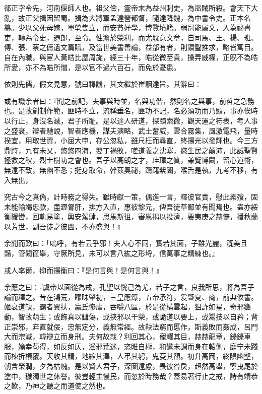 \begin{pinyinscope}
 
 
 郤正字令先，河南偃師人也。祖父儉，靈帝末為益州刺史，為盜賊所殺。會天下大亂，故正父揖因留蜀。揖為大將軍孟達營都督，隨達降魏，為中書令史。正本名纂。少以父死母嫁，單煢隻立，而安貧好學，博覽墳籍。弱冠能屬文，入為祕書吏，轉為令史，遷郎，至令。性澹於榮利，而尤耽意文章，自司馬、王、楊、班、傅、張、蔡之儔遺文篇賦，及當世美書善論，益部有者，則鑽鑿推求，略皆寓目。自在內職，與宦人黃皓比屋周旋，經三十年，皓從微至貴，操弄威權，正旣不為皓所愛，亦不為皓所憎，是以官不過六百石，而免於憂患。
 
 
 
 
 依則先儒，假文見意，號曰釋譏，其文繼於崔駰達旨。其辭曰：
 
 
 
 
 或有譏余者曰：『聞之前記，夫事與時並，名與功偕，然則名之與事，前哲之急務也。是故創制作範，匪時不立，流稱垂名，匪功不記，名必須功而乃顯，事亦俟時以行止，身沒名滅，君子所耻。是以達人研道，探賾索微，觀天運之符表，考人事之盛衰，辯者馳說，智者應機，謀夫演略，武士奮威，雲合霧集，風激電飛，量時揆宜，用取世資，小屈大申，存公忽私，雖尺枉而尋直，終揚光以發輝也。今三方鼎跱，九有未乂，悠悠四海，嬰丁禍敗，嗟道義之沈塞，愍生民之顛沛，此誠聖賢拯救之秋，烈士樹功之會也。吾子以高朗之才，珪璋之質，兼覽博闚，留心道術，無遠不致，無幽不悉；挺身取命，幹茲奧祕，躊躇紫闥，喉舌是執，九考不移，有入無出，
 
 
 究古今之真偽，計時務之得失。雖時獻一策，偶進一言，釋彼官責，慰此素飱，固未能輸竭忠款，盡瀝胷肝，排方入直，惠彼黎元，俾吾徒草鄙並有聞焉也。盍亦綏衡緩轡，回軌易塗，輿安駕肆，思馬斯徂，審厲揭以投濟，要夷庚之赫憮，播秋蘭以芳世，副吾徒之彼圖，不亦盛與！』
 
 
 
 
 余聞而歎曰：「嗚呼，有若云乎邪！夫人心不同，實若其面，子雖光麗，旣美且豔，管闚筐舉，守厥所見，未可以言八紘之形埒，信萬事之精練也。』
 
 
 
 
 或人率爾，抑而揚衡曰：『是何言與！是何言與！』
 
 
 
 
 余應之曰：『虞帝以面從為戒，孔聖以恱己為尤，若子之言，良我所思，將為吾子論而釋之。昔在鴻荒，矇昧肈初，三皇應籙，五帝承符，爰曁夏、商，前典攸書。姬衰道缺，霸者翼扶，嬴氏慘虐，吞嚼八區，於是從橫雲起，狙詐如星，奇邪蠭動，智故萌生；或飾真以讎偽，或挾邪以干榮，或詭道以要上，或鬻技以自矜；背正崇邪，弃直就佞，忠無定分，義無常經。故鞅法窮而慝作，斯義敗而姦成，呂門大而宗滅，韓辯立而身刑。夫何故哉？利回其心，寵耀其目，赫赫龍章，鑠鑠車服，媮幸苟得，如反如仄，淫邪荒迷，恣睢自極，和鸞未調而身在轅側，庭宁未踐而棟折榱覆。天收其精，地縮其澤，人弔其躬，鬼芟其頟。初升高岡，終隕幽壑，朝含榮潤，夕為枯魄。是以賢人君子，深圖遠慮，畏彼咎戾，超然高舉，寧曳尾於塗中，穢濁世之休譽。彼豈輕主慢民，而忽於時務哉？蓋易著行止之戒，詩有靖恭之歎，乃神之聽之而道使之然也。
 

\end{pinyinscope}
